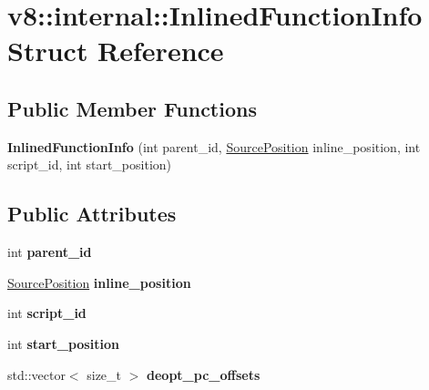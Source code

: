 \hypertarget{structv8_1_1internal_1_1_inlined_function_info}{}\section{v8\+:\+:internal\+:\+:Inlined\+Function\+Info Struct Reference}
\label{structv8_1_1internal_1_1_inlined_function_info}
\subsection*{Public Member Functions}
\begin{DoxyCompactItemize}
\item 
{\bfseries Inlined\+Function\+Info} (int parent\+\_\+id, \hyperlink{classv8_1_1internal_1_1_source_position}{Source\+Position} inline\+\_\+position, int script\+\_\+id, int start\+\_\+position)\hypertarget{structv8_1_1internal_1_1_inlined_function_info_a769e9dea76d2665113d2bea181968540}{}\label{structv8_1_1internal_1_1_inlined_function_info_a769e9dea76d2665113d2bea181968540}

\end{DoxyCompactItemize}
\subsection*{Public Attributes}
\begin{DoxyCompactItemize}
\item 
int {\bfseries parent\+\_\+id}\hypertarget{structv8_1_1internal_1_1_inlined_function_info_a1d10c37c6d9a4d9d7b5d1d004b7ae0e5}{}\label{structv8_1_1internal_1_1_inlined_function_info_a1d10c37c6d9a4d9d7b5d1d004b7ae0e5}

\item 
\hyperlink{classv8_1_1internal_1_1_source_position}{Source\+Position} {\bfseries inline\+\_\+position}\hypertarget{structv8_1_1internal_1_1_inlined_function_info_afa8906e49daaf95cfbaecef634227527}{}\label{structv8_1_1internal_1_1_inlined_function_info_afa8906e49daaf95cfbaecef634227527}

\item 
int {\bfseries script\+\_\+id}\hypertarget{structv8_1_1internal_1_1_inlined_function_info_a0da93705ae3c77e063a3ca1e4b587df3}{}\label{structv8_1_1internal_1_1_inlined_function_info_a0da93705ae3c77e063a3ca1e4b587df3}

\item 
int {\bfseries start\+\_\+position}\hypertarget{structv8_1_1internal_1_1_inlined_function_info_a2a1884ebc4061f24c96c7467e28adda7}{}\label{structv8_1_1internal_1_1_inlined_function_info_a2a1884ebc4061f24c96c7467e28adda7}

\item 
std\+::vector$<$ size\+\_\+t $>$ {\bfseries deopt\+\_\+pc\+\_\+offsets}\hypertarget{structv8_1_1internal_1_1_inlined_function_info_ae83075ed345453e95dd4500e5f93110d}{}\label{structv8_1_1internal_1_1_inlined_function_info_ae83075ed345453e95dd4500e5f93110d}

\end{DoxyCompactItemize}
